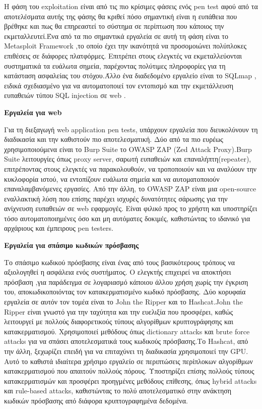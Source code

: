     Η φάση του \lt exploitation \gt είναι από τις πιο κρίσιμες φάσεις ενός \lt pen test \gt αφού από τα αποτελέσματα αυτής της φάσης θα κριθεί πόσο σημαντική είναι η ευπάθεια που βρέθηκε και πως θα επηρεαστεί το σύστημα σε περίπτωση που κάποιος την εκμεταλλευτεί.Ένα από τα πιο σημαντικά εργαλεία σε αυτή τη φάση είναι το \lt Metasploit Framework \gt,το οποίο έχει την ικανότητά  να προσομοιώνει πολύπλοκες επιθέσεις σε διάφορες πλατφόρμες. Επιτρέπει στους ελεγκτές να εκμεταλλεύονται συστηματικά τα ευάλωτα σημεία, παρέχοντας πολύτιμες πληροφορίες για τη κατάσταση ασφαλείας του στόχου.Άλλο ένα διαδεδομένο εργαλείο είναι το \lt SQLmap \gt , ειδικά σχεδιασμένο για να αυτοματοποιεί τον εντοπισμό και την εκμετάλλευση ευπαθειών τύπου \lt SQL injection \gt σε \lt web .
\begin{center}
    \textbf{Εργαλεία για \lt web }
\end{center}
    Για τη διεξαγωγή  \lt web application pen tests\gt, υπάρχουν εργαλεία που διευκολύνουν τη διαδικασία και την καθιστούν πιο αποτελεσματική. Δύο από τα πιο ευρέως χρησιμοποιούμενα είναι το \lt Burp Suite  το \lt OWASP ZAP (Zed Attack Proxy). \lt Burp Suite  λειτουργίες όπως \lt proxy server\gt, σαρωτή ευπαθειών και επαναλήπτη\lt (repeater)\gt, επιτρέποντας στους ελεγκτές να παρακολουθούν, να τροποποιούν και να αναλύουν την κυκλοφορία ιστού, να εντοπίζουν ευάλωτα σημεία και να αυτοματοποιούν επαναλαμβανόμενες εργασίες. Από την άλλη, το \lt OWASP ZAP \gt είναι μια \lt open-source \gt εναλλακτική λύση που επίσης παρέχει ισχυρές δυνατότητες σάρωσης για την ανίχνευση ευπαθειών σε \lt web \gt εφαρμογές. Είναι φιλικό προς το χρήστη και υποστηρίζει τόσο αυτοματοποιημένες όσο και μη αυτόματες δοκιμές, καθιστώντας το ιδανικό για αρχάριους και έμπειρους \lt pen testers.\gt
\vspace{1em}
\begin{center}
    \textbf{Εργαλεία για σπάσιμο κωδικών πρόσβασης}
\end{center}
    Το σπάσιμο κωδικού πρόσβασης είναι ένας από τους βασικότερους τρόπους να αξιολογηθεί η ασφάλεια ενός συστήματος. Ο ελεγκτής επιχειρεί να αποκτήσει πρόσβαση ,για παράδειγμα σε λογαριασμό κάποιου άλλου χρήση χωρίς την έγκριση του, αποκωδικοποιόντας τον κατακερματισμένο κωδικό πρόσβασης. Δύο κορυφαία εργαλεία σε αυτόν τον τομέα είναι το \lt John the Ripper \gt και το \lt Hashcat. \lt John the Ripper \gt είναι γνωστό για την ταχύτητα και την ευελιξία που προσφέρει, καθώς λειτουργεί με πολλούς διαφορετικούς τύπους αλγορίθμων κρυπτογράφησης και κατακερματισμού. Χρησιμοποιεί μεθόδους όπως \lt dictionary attacks \gt και \lt brute force attacks \gt για να σπάσει αποτελεσματικά τους κωδικούς πρόσβασης.Το \lt Hashcat\gt, από την άλλη, ξεχωρίζει επειδή για να επιταχύνει τη διαδικασία χρησιμοποιεί την \lt GPU\gt. Αυτό το καθιστά ιδιαίτερα χρήσιμο εργαλείο σε περιπτώσεις περίπλοκων  αλγορίθμων κατακερματισμού που απαιτούν πολλούς πόρους. Υποστηρίζει επίσης πολλούς τύπους κατακερματισμών και προσφέρει προηγμένες μεθόδους επίθεσης, όπως \lt hybrid attacks \gt και \lt rule-based attacks\gt, καθιστώντας το πολύ αποτελεσματικό στην ανάκτηση κωδικών πρόσβασης από διάφορα κρυπτογραφημένα δεδομένα.
 




